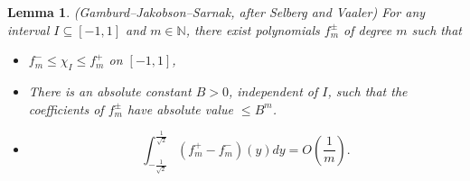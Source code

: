 \documentclass[10pt]{amsart}
\newtheorem{lemm}[theo]{Lemma}\newtheorem{prop}[theo]{Proposition}\newtheorem{coro}[theo]{Corollary}\newtheorem{conj}[theo]{Conjecture}
\theoremstyle{definition}\newtheorem{defi}[theo]{Definition}\newtheorem{rema}[theo]{Remark}\newtheorem{exam}[theo]{Example}\newtheorem{exem}[theo]{Example}\newtheorem{nota}[theo]{Notation}
\newcommand{\N}{\mathbb{N}}
\begin{document}
\begin{lemm}\label{lem:gjs}
(Gamburd--Jakobson--Sarnak, after Selberg and Vaaler) For any interval $I \subseteq [-1,1]$ and $m \in \N$, there exist polynomials $f_{m}^{\pm}$ of degree $m$ such that
\begin{itemize}
\item $f_{m}^{-} \leq \chi_{I} \leq f_{m}^{+}$ on $[-1,1]$,
\item There is an absolute constant $B>0$, independent of $I$, such that the coefficients of $f_{m}^{\pm}$ have absolute value $\leq B^{m}$.
\item
\[
\int_{-\frac{1}{\sqrt{2}}}^{\frac{1}{\sqrt{2}}}(f_{m}^{+}-f_{m}^{-})(y)dy=O\left(\frac{1}{m}\right).
\]
\end{itemize}
\end{lemm}
\end{document}

